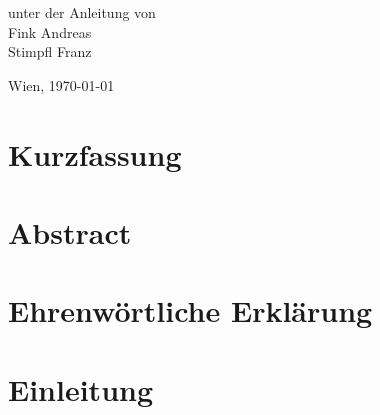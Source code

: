 \documentclass[
    headings=optiontotocandhead,%
    oneside,
    numbers=noenddot,%
    toc=flat, %
    12pt, %
    titlepage, %
    parskip=full, %
    listof=totoc, %
    listof=flat, %
    numbers=noenddot, %
    bibliography=totoc, %
    a4paper,DIV=14,
    BCOR=15mm,
]{scrbook}
\begin{document}
\begin{titlepage}
\begin{center}
\par\end{center}{\large \par}

\begin{center}
\vspace{20mm}
 \normalsize unter der Anleitung von\\
 \vspace{0.5cm}
 Fink Andreas\\
Stimpfl Franz
\par\end{center}

\begin{center}
\vspace{5mm}
Wien, \today
\par\end{center}

\end{titlepage}%

\chapter*{Kurzfassung}


\chapter*{Abstract}


\chapter*{Ehrenwörtliche Erklärung}


\cleardoublepage{}
\tableofcontents{}
\cleardoublepage{}
\listoftables
\cleardoublepage{}
\listoffigures

\cleardoublepage{}
\mainmatter


\chapter{Einleitung}\label{Einleitung}
\end{document}
